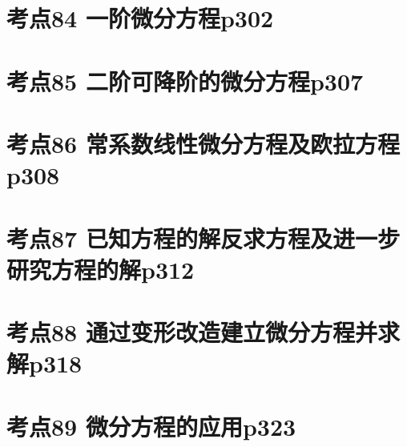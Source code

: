 \section{考点84 一阶微分方程p302}

\section{考点85 二阶可降阶的微分方程p307}

\section{考点86 常系数线性微分方程及欧拉方程p308}

\section{考点87 已知方程的解反求方程及进一步研究方程的解p312}

\section{考点88 通过变形改造建立微分方程并求解p318}

\section{考点89 微分方程的应用p323}

